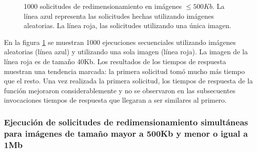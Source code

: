 \begin{figure}[h]
\hspace{-1.0cm}
\caption[hola]{1000 solicitudes de redimensionamiento en imágenes $\leq 500Kb$. La línea azul representa las solicitudes hechas utilizando imágenes aleatorias. La línea roja, las solicitudes utilizando una única imagen.}
\label{fig:1000-ejecuciones-secuenciales-500kb}
\end{figure}

En la figura \ref{fig:1000-ejecuciones-secuenciales-500kb} se muestran 1000 ejecuciones secuenciales utilizando imágenes aleatorias (línea azul) y utilizando una sola imagen (línea roja). La imagen de la línea roja es de tamaño 40Kb. Los resultados de los tiempos de respuesta muestran una tendencia marcada: la primera solicitud tomó mucho más tiempo que el resto. Una vez realizada la primera solicitud, los tiempos de respuesta de la función mejoraron considerablemente y no se observaron en las subsecuentes invocaciones tiempos de respuesta que llegaran a ser similares al primero. 


\subsubsection{Ejecución de solicitudes de redimensionamiento simultáneas para imágenes de tamaño mayor a 500Kb y menor o igual a 1Mb}

